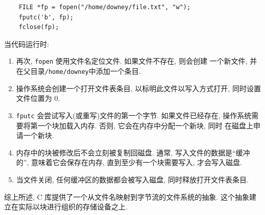 \documentclass[12pt]{book}
\begin{document}
{\begin{verbatim}
    FILE *fp = fopen("/home/downey/file.txt", "w");
    fputc('b', fp);
    fclose(fp);
\end{verbatim}

当代码运行时:

\begin{enumerate}
%
\item 再次, {\tt fopen} 使用文件名定位文件. 如果文件不存在, 则会创建
  一个新文件, 并在父目录{\tt /home/downey}中添加一个条目.

\item 操作系统会创建一个打开文件表条目, 以标明此文件以写入方式打开, 
  同时设置文件位置为 0.

%
%
\item {\tt fputc} 会尝试写入(或重写)文件的第一个字节. 如果文件已经存在,
  操作系统需要将第一个块加载入内存. 否则, 它会在内存中分配一个新块, 同时
  在磁盘上申请一个新块.

\item 内存中的块被修改后不会立刻被复制回磁盘. 通常, 写入文件的数据是``缓冲的'',
  意味着它会保存在内存, 直到至少有一个块需要写入, 才会写入磁盘.

\item 当文件关闭, 任何缓冲区的数据都会被写入磁盘, 同时释放打开文件表条目.

\end{enumerate}
综上所述, C 库提供了一个从文件名映射到字节流的文件系统的抽象. 
这个抽象建立在实际以块进行组织的存储设备之上.

}
\end{document}
